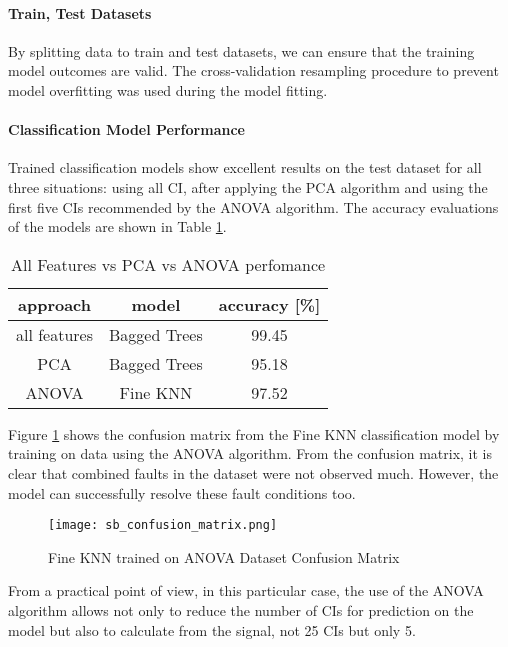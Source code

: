 \paragraph{Train, Test Datasets} By splitting data to train and test
datasets, we can ensure that the training model outcomes are valid. The
cross-validation resampling procedure to prevent model overfitting was used
during the model fitting.

\paragraph{Classification Model Performance}


Trained classification models show excellent results on the test dataset
for all three situations: using all CI, after applying the PCA algorithm
and using the first five CIs recommended by the ANOVA algorithm.  The
accuracy evaluations of the models are shown in Table
\ref{tab:classification_perfomance}.

\begin{table}[h!]
    \centering
    \begin{tabular}{|c|c|c|}
        \hline
        \textbf{approach} & \textbf{model}     &  \textbf{accuracy [\%]} \\
        \hline
        all features      &  Bagged Trees      &  99.45  \\
        PCA               &  Bagged Trees      &  95.18  \\
        ANOVA             &  Fine KNN          &  97.52  \\
        \hline
    \end{tabular}
    \caption{All Features vs PCA vs ANOVA perfomance}
    \label{tab:classification_perfomance}
\end{table}

Figure \ref{fig:conf_matrix} shows the confusion matrix from the Fine KNN
classification model by training on data using the ANOVA algorithm.  From
the confusion matrix, it is clear that combined faults in the dataset were
not observed much. However, the model can successfully resolve these fault
conditions too.

\begin{figure}[h!]
    \centering
    \texttt{[image: sb\_confusion\_matrix.png]}
    \caption{Fine KNN trained on ANOVA Dataset Confusion Matrix}
    \label{fig:conf_matrix}
\end{figure}

From a practical point of view, in this particular case, the use of the
ANOVA algorithm allows not only to reduce the number of CIs for prediction
on the model but also to calculate from the signal, not 25 CIs but only 5. 

